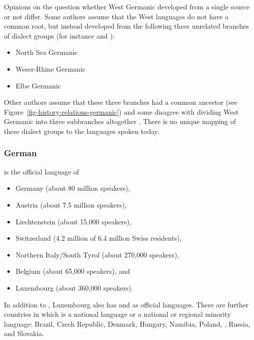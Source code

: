 Opinions on the question whether West Germanic developed from a single source or not differ. Some authors
assume that the West  languages do not have a common root, but instead developed from the
following three unrelated branches of dialect groups (for instance \citealp[--18]{Robinson1992a-u} and
\citealp[]{HvDA94a}):
\begin{itemize}
\item North Sea Germanic %
\item Weser-Rhine Germanic %
\item Elbe Germanic %
\end{itemize}
Other authors assume that these three branches had a common ancestor (see
Figure~\ref{fig-history-relations-germanic}) and some disagree with dividing West Germanic into
three subbranches altogether \citep{Stiles2013a-u}.
There is no unique mapping of these dialect groups to the languages spoken today.%

\largerpage
\subsubsection{German}

 is the official language of
\begin{itemize}
\item Germany (about 80 million speakers), 
\item Austria (about 7.5 million speakers), 
\item Liechtenstein (about 15,000 speakers), 
\item Switzerland (4.2 million of 6.4 million Swiss residents),
\item Northern Italy/South Tyrol (about 270,000 speakers), 
\item Belgium (about 65,000 speakers), and
\item Luxembourg (about 360,000 speakers).
\end{itemize}
In addition to , Luxembourg also has  and  as official
languages. 
There are further countries in which  is a national language or a national or regional
minority language: Brazil, Czech Republic, Denmark, Hungary, Namibia, Poland, , Russia, and Slovakia.

